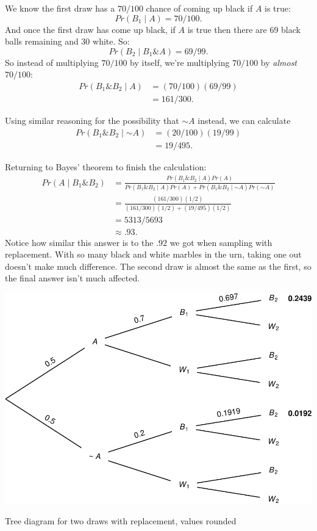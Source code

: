 \documentclass[justified]{tufte-book}
\newcommand{\given}{\mid}
\renewcommand{\neg}{\mathbin{\sim}}
\renewcommand{\wedge}{\mathbin{\&}}
\newcommand{\p}{Pr}
\theoremstyle{definition}
\theoremstyle{definition}
\theoremstyle{definition}
\theoremstyle{remark}
\begin{document}
We know the first draw has a \(70/100\) chance of coming up black if
\(A\) is true: \[ \p(B_1 \given A) = 70/100. \] And once the first draw
has come up black, if \(A\) is true then there are 69 black balls
remaining and 30 white. So: \[ \p(B_2 \given B_1 \wedge A) = 69/99. \]
So instead of multiplying \(70/100\) by itself, we're multiplying
\(70/100\) by \emph{almost} \(70/100\): \[
  \begin{aligned}
    \p(B_1 \wedge B_2 \given A) &= (70/100)(69/99)\\
       &= 161/300.
  \end{aligned}
\]

Using similar reasoning for the possibility that \(\neg A\) instead, we
can calculate \[
  \begin{aligned}
    \p(B_1 \wedge B_2 \given \neg A) &= (20/100)(19/99)\\
       &= 19/495.
  \end{aligned}
\]

Returning to Bayes' theorem to finish the calculation: \[
  \begin{aligned}
    \p(A \given B_1 \wedge B_2) &= \frac{\p(B_1 \wedge B_2 \given A)\p(A)}{\p(B_1 \wedge B_2 \given A) \p(A) + \p(B_1 \wedge B_2 \given \neg A) \p(\neg A)} \\
      &= \frac{(161/300)(1/2)}{(161/300)(1/2) + (19/495)(1/2)} \\
      &= 5313/5693 \\
      &\approx .93. 
  \end{aligned}
\] Notice how similar this answer is to the \(.92\) we got when sampling
with replacement. With so many black and white marbles in the urn,
taking one out doesn't make much difference. The second draw is almost
the same as the first, so the final answer isn't much affected.

\begin{marginfigure}
\includegraphics{_main_files/figure-latex/twodrawsnoreplacement-1} \caption[Tree diagram for two draws with replacement, values rounded]{Tree diagram for two draws with replacement, values rounded}\label{fig:twodrawsnoreplacement}
\end{marginfigure}
\end{document}
